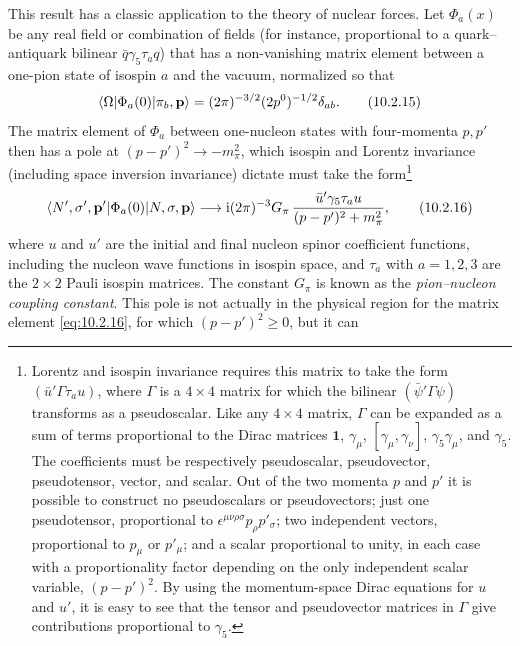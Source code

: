 This result has a classic application to the theory of nuclear forces. Let
$\Phi_a(x)$ be any real field or combination of fields (for instance, proportional
to a quark--antiquark bilinear $\bar q\gamma_5\tau_a q$) that has a non-vanishing matrix
element between a one-pion state of isospin $a$ and the vacuum, normalized
so that
\begin{equation}
  \langle \Omega\rvert\Phi_a(0)\lvert \pi_b,\mathbf p\rangle
  =(2\pi)^{-3/2}(2p^0)^{-1/2}\delta_{ab}.
  \tag{10.2.15}\label{eq:10.2.15}
\end{equation}
The matrix element of $\Phi_a$ between one-nucleon states with four-momenta
$p,p'$ then has a pole at $(p-p')^2\to-m_\pi^2$, which isospin and Lorentz
invariance (including space inversion invariance) dictate must take the
form\footnote{Lorentz and isospin invariance requires this matrix to take the form
$(\bar u'\Gamma\tau_a u)$, where $\Gamma$ is a $4\times4$ matrix for which the bilinear
$(\bar\psi'\Gamma\psi)$ transforms as a pseudoscalar. Like any $4\times4$ matrix, $\Gamma$ can
be expanded as a sum of terms proportional to the Dirac matrices $\mathbf{1}$, $\gamma_\mu$,
$[\gamma_\mu,\gamma_\nu]$, $\gamma_5\gamma_\mu$, and $\gamma_5$. The coefficients must be respectively
pseudoscalar, pseudovector, pseudotensor, vector, and scalar. Out of the two momenta
$p$ and $p'$ it is possible to construct no pseudoscalars or pseudovectors; just one
pseudotensor, proportional to $\epsilon^{\mu\nu\rho\sigma}p_\rho p'_\sigma$; two independent vectors,
proportional to $p_\mu$ or $p'_\mu$; and a scalar proportional to unity, in each case with a
proportionality factor depending on the only independent scalar variable, $(p-p')^2$.
By using the momentum-space Dirac equations for $u$ and $u'$, it is easy to see that
the tensor and pseudovector matrices in $\Gamma$ give contributions proportional to $\gamma_5$.}
\begin{equation}
  \langle N',\sigma',\mathbf p'\rvert\Phi_a(0)\lvert N,\sigma,\mathbf p\rangle
  \longrightarrow \mathrm{i}(2\pi)^{-3}G_\pi\,
  \frac{\bar u'\gamma_5\tau_a u}{(p-p')^2+m_\pi^2},
  \tag{10.2.16}\label{eq:10.2.16}
\end{equation}
where $u$ and $u'$ are the initial and final nucleon spinor coefficient functions,
including the nucleon wave functions in isospin space, and $\tau_a$ with $a=
1,2,3$ are the $2\times2$ Pauli isospin matrices. The constant $G_\pi$ is known as the
\textit{pion--nucleon coupling constant}. This pole is not actually in the physical
region for the matrix element \eqref{eq:10.2.16}, for which $(p-p')^2\geq0$, but it can
